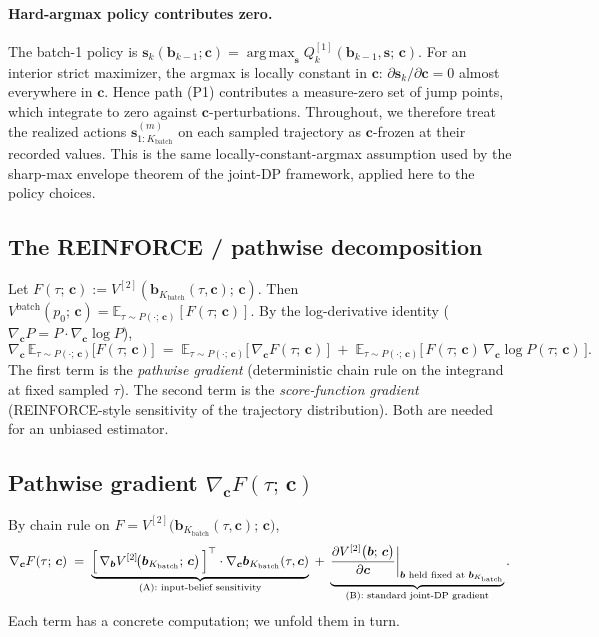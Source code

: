 \documentclass[11pt,a4paper]{article}
\newcommand{\bc}{\bm{c}}
\newcommand{\bs}{\bm{s}}
\newcommand{\bb}{\bm{b}}
\newcommand{\E}{\mathbb{E}}
\newcommand{\argmax}{\operatorname*{arg\,max}}
\begin{document}
\paragraph{Hard-argmax policy contributes zero.}
The batch-1 policy is $\bs_k(\bb_{k-1}; \bc) = \argmax_{\bs} Q^{[1]}_k(\bb_{k-1}, \bs;\, \bc)$.
For an interior strict maximizer, the argmax is locally constant in $\bc$:
$\partial \bs_k / \partial \bc = 0$ almost everywhere in $\bc$.  Hence path (P1)
contributes a measure-zero set of jump points, which integrate to zero against
$\bc$-perturbations.  Throughout, we therefore treat the realized actions
$\bs^{(m)}_{1:K_\mathrm{batch}}$ on each sampled trajectory as
$\bc$-frozen at their recorded values.  This is the same locally-constant-argmax
assumption used by the sharp-max envelope theorem of the joint-DP framework, applied here
to the policy choices.

\subsection{The REINFORCE / pathwise decomposition}
\label{sec:reinforce}

Let $F(\tau;\, \bc) := V^{[2]}(\bb_{K_\mathrm{batch}}(\tau, \bc);\, \bc)$.  Then
$V^\mathrm{batch}(p_0;\, \bc) = \E_{\tau \sim P(\cdot;\, \bc)}[F(\tau;\, \bc)]$.  By the
log-derivative identity ($\nabla_{\bc} P = P \cdot \nabla_{\bc} \log P$),
\begin{equation}
\nabla_{\bc}\, \E_{\tau \sim P(\cdot;\, \bc)}\!\bigl[F(\tau;\, \bc)\bigr]
\;=\;
\E_{\tau \sim P(\cdot;\, \bc)}\!\bigl[\,\nabla_{\bc} F(\tau;\, \bc)\,\bigr]
\;+\;
\E_{\tau \sim P(\cdot;\, \bc)}\!\bigl[\,F(\tau;\, \bc)\, \nabla_{\bc} \log P(\tau;\, \bc)\,\bigr].
\label{eq:reinforce}
\end{equation}
The first term is the \emph{pathwise gradient} (deterministic chain rule on the integrand
at fixed sampled $\tau$).  The second term is the \emph{score-function gradient}
(REINFORCE-style sensitivity of the trajectory distribution).  Both are needed for an
unbiased estimator.

\subsection{Pathwise gradient \texorpdfstring{$\nabla_{\bc} F(\tau;\, \bc)$}{nabla\_c F}}
\label{sec:pathwise}

By chain rule on $F = V^{[2]}\bigl(\bb_{K_\mathrm{batch}}(\tau, \bc);\, \bc\bigr)$,
\begin{equation}
\nabla_{\bc} F(\tau;\, \bc)
\;=\;
\underbrace{\Bigl[\,\nabla_{\bb} V^{[2]}\!\bigl(\bb_{K_\mathrm{batch}};\, \bc\bigr)\,\Bigr]^\top \cdot \nabla_{\bc} \bb_{K_\mathrm{batch}}(\tau, \bc)}_{\text{(A): input-belief sensitivity}}
\;+\;
\underbrace{\biggl.\frac{\partial V^{[2]}\bigl(\bb;\, \bc\bigr)}{\partial \bc}\biggr|_{\bb \text{ held fixed at } \bb_{K_\mathrm{batch}}}}_{\text{(B): standard joint-DP gradient}}.
\label{eq:pathwise}
\end{equation}
Each term has a concrete computation; we unfold them in turn.
\end{document}
